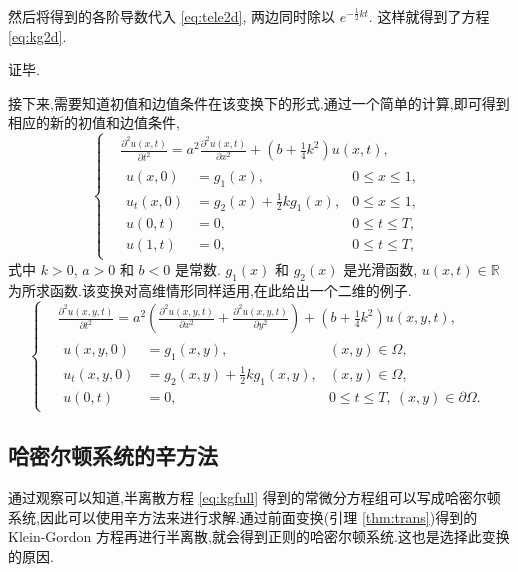 然后将得到的各阶导数代入 \eqref{eq:tele2d}, 两边同时除以 $e^{-\frac{1}{2}kt}$. 这样就得到了方程 \eqref{eq:kg2d}.

证毕.

接下来,需要知道初值和边值条件在该变换下的形式.通过一个简单的计算,即可得到相应的新的初值和边值条件,
\begin{equation}\label{eq:kgfull}
\left\lbrace
\begin{aligned}
&\frac{\partial ^2 u(x,t)}{\partial t^2}=a^2 \frac{\partial ^2 u(x,t)}{\partial x^2} + (b+\frac{1}{4}k^2) u(x,t),\\
&\begin{aligned}
u(x,0)&=g_1(x),&0 \le x \le 1,\\
u_t(x,0)&=g_2(x)+\frac{1}{2}k g_1(x),&0 \le x \le 1,\\
u(0,t)&=0,&0 \le t \le T,\\
u(1,t)&=0,&0 \le t \le T,
\end{aligned}
\end{aligned}
\right.
\end{equation}
式中 $k > 0$, $a>0$ 和 $b < 0$ 是常数. $g_1(x)$ 和 $g_2(x)$ 是光滑函数, $u(x,t) \in \mathbb{R}$ 为所求函数.该变换对高维情形同样适用,在此给出一个二维的例子.
\begin{equation*}
\left\lbrace
\begin{aligned}
&\frac{\partial ^2 u(x,y,t)}{\partial t^2}=a^2 (\frac{\partial ^2 u(x,y,t)}{\partial x^2}+ \frac{\partial ^2 u(x,y,t)}{\partial y^2})
+ (b+\frac{1}{4}k^2) u(x,y,t),\\
&\begin{aligned}
u(x,y,0)&=g_1(x,y),&(x,y)\in \Omega,\\
u_t(x,y,0)&=g_2(x,y)+\frac{1}{2}k g_1(x,y),&(x,y)\in \Omega,\\
u(0,t)&=0,&0 \le t \le T,~(x,y)\in \partial\Omega .
\end{aligned}
\end{aligned}
\right.
\end{equation*}

\subsection{哈密尔顿系统的辛方法}
通过观察可以知道,半离散方程 \eqref{eq:kgfull} 得到的常微分方程组可以写成哈密尔顿系统,因此可以使用辛方法来进行求解.通过前面变换(引理 \ref{thm:trans})得到的 Klein-Gordon 方程再进行半离散,就会得到正则的哈密尔顿系统.这也是选择此变换的原因.

